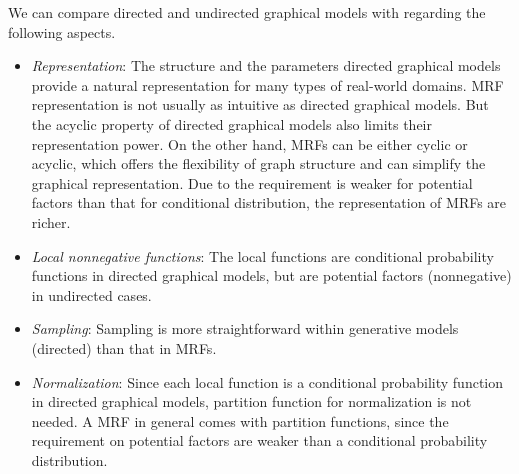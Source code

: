 \begin{remark}
  We can compare directed and undirected graphical models with regarding the following aspects.
  \begin{itemize}
  \item \textit{Representation}: The structure and the parameters directed graphical models provide a natural representation for many types of real-world domains. MRF representation is not usually as intuitive as directed graphical models. But the acyclic property of directed graphical models also limits their representation power. On the other hand, MRFs can be either cyclic or acyclic, which offers the flexibility of graph structure and can simplify the graphical representation. Due to the requirement is weaker for potential factors than that for conditional distribution, the representation of MRFs are richer. 
  \item \textit{Local nonnegative functions}: The local functions are conditional probability functions in directed graphical models, but are potential factors (nonnegative) in undirected cases.
  \item \textit{Sampling}: Sampling is more straightforward within generative models (directed) than that in MRFs.
  \item \textit{Normalization}: Since each local function is a conditional probability function in directed graphical models, partition function for normalization is not needed. A MRF in general comes with partition functions, since the requirement on potential factors are weaker than a conditional probability distribution.
  \end{itemize}
\end{remark}




